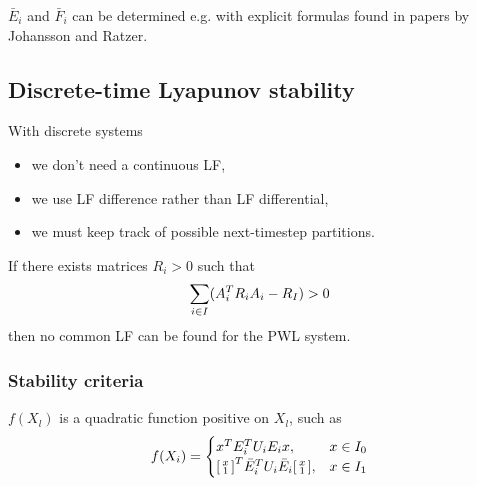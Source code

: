 $\bar{E}_i$ and $\bar{F}_i$ can be determined e.g. with explicit formulas found in papers by Johansson and Ratzer.

\subsection{Discrete-time Lyapunov stability}
With discrete systems
\begin{itemize}
  \item we don't need a continuous LF,
  \item we use LF difference rather than LF differential,
  \item we must keep track of possible next-timestep partitions.
\end{itemize}

If there exists matrices $R_i > 0$ such that
%
\begin{equation}
  \sum_{i \in I} (A_i^{T} R_i A_i - R_I) > 0
\end{equation}
%
then no common LF can be found for the PWL system.

\subsubsection{Stability criteria}
$f(X_l)$ is a quadratic function positive on $X_l$, such as
\begin{equation}
  f(X_i) =
  \begin{cases}
    x^{T} E_i^{T} U_i E_i x, & x \in I_0 \\
    \begin{bsmallmatrix} x \\ 1 \end{bsmallmatrix}^{T} \bar{E}_i^{T} U_i \bar{E}_i \begin{bsmallmatrix} x \\ 1 \end{bsmallmatrix}, & x \in I_1
  \end{cases}
\end{equation}

